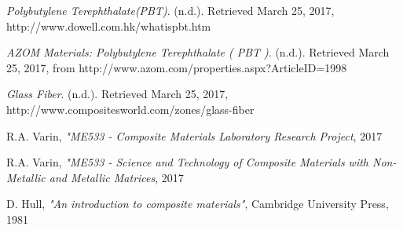 \documentclass[11pt]{article}
\begin{document}
\newpage
\begin{thebibliography}{9}
\raggedright

\textit{Polybutylene Terephthalate(PBT)}. (n.d.). Retrieved March 25, 2017, http://www.dowell.com.hk/whatispbt.htm

\textit{AZOM Materials: Polybutylene Terephthalate ( PBT )}. (n.d.). Retrieved March 25, 2017, from http://www.azom.com/properties.aspx?ArticleID=1998

\textit{Glass Fiber}. (n.d.). Retrieved March 25, 2017, http://www.compositesworld.com/zones/glass-fiber

R.A. Varin, \textit{"ME533 - Composite Materials Laboratory Research Project}, 2017

R.A. Varin, \textit{"ME533 - Science and Technology of Composite Materials with Non-Metallic and Metallic Matrices}, 2017

D. Hull, \textit{"An introduction to composite materials"}, Cambridge University Press, 1981

\end{thebibliography}
\end{document}
